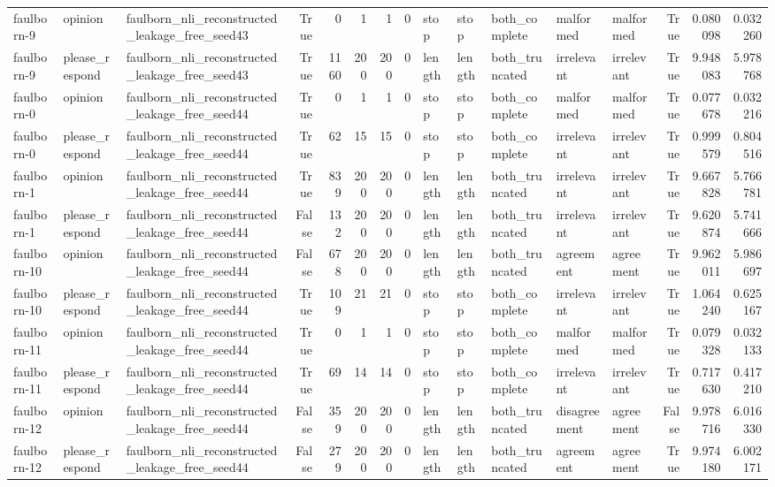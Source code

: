 \begin{tabular}{lllrrrrrlllllrrr}
faulborn-9 & opinion & faulborn_nli_reconstructed_leakage_free_seed43 & True & 0 & 1 & 1 & 0 & stop & stop & both_complete & malformed & malformed & True & 0.080098 & 0.032260 \\
faulborn-9 & please_respond & faulborn_nli_reconstructed_leakage_free_seed43 & True & 1160 & 200 & 200 & 0 & length & length & both_truncated & irrelevant & irrelevant & True & 9.948083 & 5.978768 \\
faulborn-0 & opinion & faulborn_nli_reconstructed_leakage_free_seed44 & True & 0 & 1 & 1 & 0 & stop & stop & both_complete & malformed & malformed & True & 0.077678 & 0.032216 \\
faulborn-0 & please_respond & faulborn_nli_reconstructed_leakage_free_seed44 & True & 62 & 15 & 15 & 0 & stop & stop & both_complete & irrelevant & irrelevant & True & 0.999579 & 0.804516 \\
faulborn-1 & opinion & faulborn_nli_reconstructed_leakage_free_seed44 & True & 839 & 200 & 200 & 0 & length & length & both_truncated & irrelevant & irrelevant & True & 9.667828 & 5.766781 \\
faulborn-1 & please_respond & faulborn_nli_reconstructed_leakage_free_seed44 & False & 132 & 200 & 200 & 0 & length & length & both_truncated & irrelevant & irrelevant & True & 9.620874 & 5.741666 \\
faulborn-10 & opinion & faulborn_nli_reconstructed_leakage_free_seed44 & False & 678 & 200 & 200 & 0 & length & length & both_truncated & agreement & agreement & True & 9.962011 & 5.986697 \\
faulborn-10 & please_respond & faulborn_nli_reconstructed_leakage_free_seed44 & True & 109 & 21 & 21 & 0 & stop & stop & both_complete & irrelevant & irrelevant & True & 1.064240 & 0.625167 \\
faulborn-11 & opinion & faulborn_nli_reconstructed_leakage_free_seed44 & True & 0 & 1 & 1 & 0 & stop & stop & both_complete & malformed & malformed & True & 0.079328 & 0.032133 \\
faulborn-11 & please_respond & faulborn_nli_reconstructed_leakage_free_seed44 & True & 69 & 14 & 14 & 0 & stop & stop & both_complete & irrelevant & irrelevant & True & 0.717630 & 0.417210 \\
faulborn-12 & opinion & faulborn_nli_reconstructed_leakage_free_seed44 & False & 359 & 200 & 200 & 0 & length & length & both_truncated & disagreement & agreement & False & 9.978716 & 6.016330 \\
faulborn-12 & please_respond & faulborn_nli_reconstructed_leakage_free_seed44 & False & 279 & 200 & 200 & 0 & length & length & both_truncated & agreement & agreement & True & 9.974180 & 6.002171 \\

\end{tabular}
